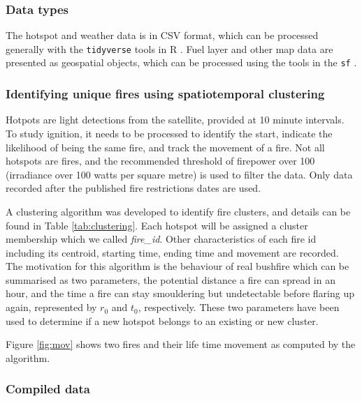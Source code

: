 \documentclass[11pt,a4paper,]{article}
\begin{document}
\hypertarget{data-types}{%
\subsubsection{Data types}\label{data-types}}

The hotspot and weather data is in CSV format, which can be processed generally with the \texttt{tidyverse} \autocite{R-tidyverse} tools in R \autocite{R}. Fuel layer and other map data are presented as geospatial objects, which can be processed using the tools in the \texttt{sf} \autocite{R-sf}.

\hypertarget{identifying-unique-fires-using-spatiotemporal-clustering}{%
\subsubsection{Identifying unique fires using spatiotemporal clustering}\label{identifying-unique-fires-using-spatiotemporal-clustering}}

Hotpots are light detections from the satellite, provided at 10 minute intervals. To study ignition, it needs to be processed to identify the start, indicate the likelihood of being the same fire, and track the movement of a fire. Not all hotspots are fires, and the recommended threshold of firepower over 100 (irradiance over 100 watts per square metre) is used to filter the data. Only data recorded after the published fire restrictions dates are used.

A clustering algorithm was developed to identify fire clusters, and details can be found in Table \ref{tab:clustering}. Each hotspot will be assigned a cluster membership which we called \emph{fire\_id}. Other characteristics of each fire id including its centroid, starting time, ending time and movement are recorded. The motivation for this algorithm is the behaviour of real bushfire which can be summarised as two parameters, the potential distance a fire can spread in an hour, and the time a fire can stay smouldering but undetectable before flaring up again, represented by \(r_0\) and \(t_0\), respectively. These two parameters have been used to determine if a new hotspot belongs to an existing or new cluster.

Figure \ref{fig:mov} shows two fires and their life time movement as computed by the algorithm.

\hypertarget{compiled-data}{%
\subsubsection{Compiled data}\label{compiled-data}}
\end{document}
